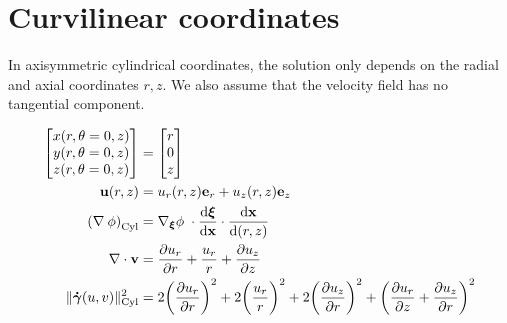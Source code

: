 \documentclass[11 pt]{report}
\begin{document}






\appendix
\chapter{Curvilinear coordinates}
\label{appendix:curvilinear}

In axisymmetric cylindrical coordinates, the solution only depends on the radial and axial coordinates $r, z$. We also assume that the velocity field has no tangential component.

\begin{align}
    \begin{bmatrix}
        x(r, \theta=0, z) \\
        y(r, \theta=0, z) \\
        z(r, \theta=0, z) \\
    \end{bmatrix} &=
    \begin{bmatrix}
        r \\
        0 \\
        z
    \end{bmatrix}\\
    \mathbf{u}(r, z) &= u_r(r, z) \mathbf{e}_r + u_z(r, z) \mathbf{e}_z\\
    \left(\nabla \: \phi\right)_{\text{Cyl}} &= \nabla_{\boldsymbol\xi} \phi \; \cdot \dv{\boldsymbol \xi}{\mathbf{x}} \cdot \dv{\mathbf{x}}{(r, z)}\\
    \nabla \cdot \mathbf{v} &= \pdv{u_r}{r} + \frac{u_r}{r} + \pdv{u_z}{z}\\
    \|\boldsymbol{\dot \gamma}(u, v)\|_{\text{Cyl}}^2 &= 2 \bigg(\pdv{u_r}{r}\bigg)^2 + 2\bigg(\frac{u_r}{r}\bigg)^2 + 2\bigg(\pdv{u_z}{r}\bigg)^2 + \bigg(\pdv{u_r}{z} + \pdv{u_z}{r}\bigg)^2
\end{align}
\end{document}
